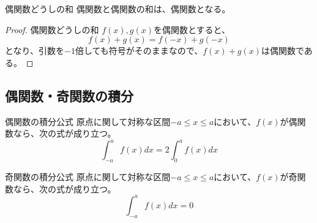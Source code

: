 \documentclass[../imaging-math]{subfiles}
\begin{document}
\begin{theorem}{偶関数どうしの和}
  偶関数と偶関数の和は、偶関数となる。
\end{theorem}

\begin{proof}{偶関数どうしの和}
  $f(x), g(x)$を偶関数とすると、
  \begin{equation}
    f(x)+g(x) = f(-x)+g(-x)
  \end{equation}
  となり、引数を$-1$倍しても符号がそのままなので、$f(x)+g(x)$は偶関数である。
\end{proof}

\subsection{偶関数・奇関数の積分}

\begin{theorem}{偶関数の積分公式}
  \titlegap
  原点に関して対称な区間$-a \leq x \leq a$において、$f(x)$が偶関数なら、次の式が成り立つ。
  \LARGE
  \begin{equation}
    \int_{-a}^{a}f(x)dx = 2\int_{0}^{a}f(x)dx
  \end{equation}
\end{theorem}

\begin{center}
\end{center}

\begin{theorem}{奇関数の積分公式}
  \titlegap
  原点に関して対称な区間$-a \leq x \leq a$において、$f(x)$が奇関数なら、次の式が成り立つ。
  \LARGE
  \begin{equation}
    \int_{-a}^{a}f(x)dx = 0
  \end{equation}
\end{theorem}
\end{document}
